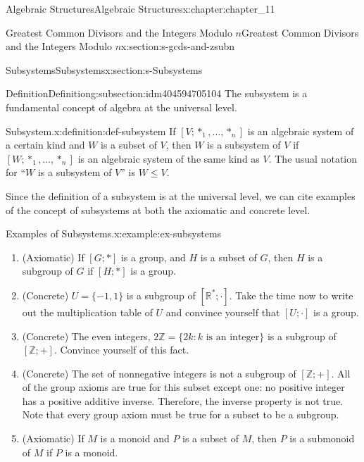 \documentclass[twoside,10pt,]{book}
\numberwithin{equation}{section}
\begin{document}
\begin{chapterptx}{Algebraic Structures}{}{Algebraic Structures}{}{}{x:chapter:chapter_11}
\begin{sectionptx}{Greatest Common Divisors  and the Integers Modulo \(n\)}{}{Greatest Common Divisors  and the Integers Modulo \(n\)}{}{}{x:section:s-gcds-and-zsubn}
\end{sectionptx}
%
%
\typeout{************************************************}
\typeout{************************************************}
%
\begin{sectionptx}{Subsystems}{}{Subsystems}{}{}{x:section:s-Subsystems}
%
%
%
\typeout{************************************************}
\typeout{************************************************}
%
\begin{subsectionptx}{Definition}{}{Definition}{}{}{g:subsection:idm404594705104}
The subsystem is a fundamental concept of algebra at the universal level.%
\begin{definition}{Subsystem.}{x:definition:def-subsystem}%
%
\label{g:notation:idm404594703600}%
If \(\left[V; *_1, \ldots ,*_n\right]\) is an algebraic system of a certain kind and \(W\) is a subset of \(V\), then \(W\) is a subsystem of \(V\) if \(\left[W; *_1, \ldots ,*_n\right]\) is an algebraic system of the same kind as \(V\). The usual notation for ``\(W\) is a subsystem of \(V\)'' is \(W \leq V\).%
\end{definition}
Since the definition of a subsystem is at the universal level, we can cite examples of the concept of subsystems at both the axiomatic and concrete level.%
\begin{example}{Examples of Subsystems.}{x:example:ex-subsystems}%
%
\begin{enumerate}[label=(\alph*)]
\item{}(Axiomatic) If \([G; *]\) is a group, and \(H\) is a subset of \(G\), then \(H\) is a subgroup of \(G\) if \([H; *]\) is a group.%
\item{}(Concrete) \(U = \{-1,1\}\) is a subgroup of \(\left[\mathbb{R}^*;\cdot \right]\). Take the time now to write out the multiplication table of \(U\) and convince yourself that \([U;\cdot ]\) is a group.%
\item{}(Concrete) The even integers, \(2\mathbb{Z} = \{2k : k \textrm{ is} \textrm{ an} \textrm{ integer}\}\) is a subgroup of \([\mathbb{Z}; +]\). Convince yourself of this fact.%
\item{}(Concrete) The set of nonnegative integers is not a subgroup of \([\mathbb{Z}; +]\). All of the group axioms are true for this subset except one: no positive integer has a positive additive inverse. Therefore, the inverse property is not true. Note that every group axiom must be true for a subset to be a subgroup.%
\item{}(Axiomatic) If \(M\) is a monoid and \(P\) is a subset of \(M\), then \(P\) is a submonoid of \(M\) if \(P\) is a monoid.%

\end{enumerate}
\end{example}
\end{subsectionptx}
\end{sectionptx}
\end{chapterptx}
\end{document}
